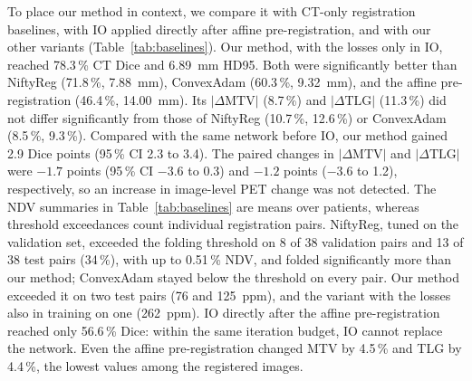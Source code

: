 To place our method in context, we compare it with CT-only registration baselines, with IO applied directly after affine pre-registration, and with our other variants (Table~\ref{tab:baselines}).
Our method, with the losses only in IO, reached 78.3\,\% CT Dice and 6.89~mm HD95.
Both were significantly better than NiftyReg (71.8\,\%, 7.88~mm), ConvexAdam (60.3\,\%, 9.32~mm), and the affine pre-registration (46.4\,\%, 14.00~mm).
Its $|\Delta\mathrm{MTV}|$ (8.7\,\%) and $|\Delta\mathrm{TLG}|$ (11.3\,\%) did not differ significantly from those of NiftyReg (10.7\,\%, 12.6\,\%) or ConvexAdam (8.5\,\%, 9.3\,\%).
Compared with the same network before IO, our method gained 2.9 Dice points (95\,\% CI 2.3 to 3.4).
The paired changes in $|\Delta\mathrm{MTV}|$ and $|\Delta\mathrm{TLG}|$ were $-1.7$ points (95\,\% CI $-3.6$ to 0.3) and $-1.2$ points ($-3.6$ to 1.2), respectively, so an increase in image-level PET change was not detected.
The NDV summaries in Table~\ref{tab:baselines} are means over patients, whereas threshold exceedances count individual registration pairs.
NiftyReg, tuned on the validation set, exceeded the folding threshold on 8 of 38 validation pairs and 13 of 38 test pairs (34\,\%), with up to 0.51\,\% NDV, and folded significantly more than our method; ConvexAdam stayed below the threshold on every pair.
Our method exceeded it on two test pairs (76 and 125~ppm), and the variant with the losses also in training on one (262~ppm).
IO directly after the affine pre-registration reached only 56.6\,\% Dice: within the same iteration budget, IO cannot replace the network.
Even the affine pre-registration changed MTV by 4.5\,\% and TLG by 4.4\,\%, the lowest values among the registered images.

